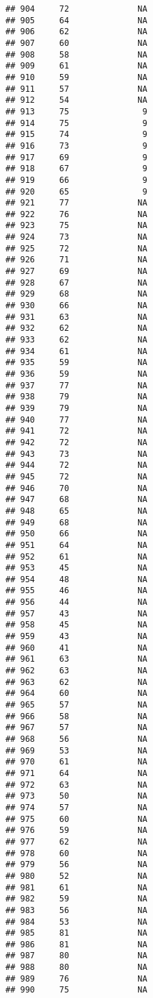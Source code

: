 \documentclass[]{article}
\begin{document}
\begin{verbatim}
## 904     72              NA
## 905     64              NA
## 906     62              NA
## 907     60              NA
## 908     58              NA
## 909     61              NA
## 910     59              NA
## 911     57              NA
## 912     54              NA
## 913     75               9
## 914     75               9
## 915     74               9
## 916     73               9
## 917     69               9
## 918     67               9
## 919     66               9
## 920     65               9
## 921     77              NA
## 922     76              NA
## 923     75              NA
## 924     73              NA
## 925     72              NA
## 926     71              NA
## 927     69              NA
## 928     67              NA
## 929     68              NA
## 930     66              NA
## 931     63              NA
## 932     62              NA
## 933     62              NA
## 934     61              NA
## 935     59              NA
## 936     59              NA
## 937     77              NA
## 938     79              NA
## 939     79              NA
## 940     77              NA
## 941     72              NA
## 942     72              NA
## 943     73              NA
## 944     72              NA
## 945     72              NA
## 946     70              NA
## 947     68              NA
## 948     65              NA
## 949     68              NA
## 950     66              NA
## 951     64              NA
## 952     61              NA
## 953     45              NA
## 954     48              NA
## 955     46              NA
## 956     44              NA
## 957     43              NA
## 958     45              NA
## 959     43              NA
## 960     41              NA
## 961     63              NA
## 962     63              NA
## 963     62              NA
## 964     60              NA
## 965     57              NA
## 966     58              NA
## 967     57              NA
## 968     56              NA
## 969     53              NA
## 970     61              NA
## 971     64              NA
## 972     63              NA
## 973     50              NA
## 974     57              NA
## 975     60              NA
## 976     59              NA
## 977     62              NA
## 978     60              NA
## 979     56              NA
## 980     52              NA
## 981     61              NA
## 982     59              NA
## 983     56              NA
## 984     53              NA
## 985     81              NA
## 986     81              NA
## 987     80              NA
## 988     80              NA
## 989     76              NA
## 990     75              NA

\end{verbatim}
\end{document}
